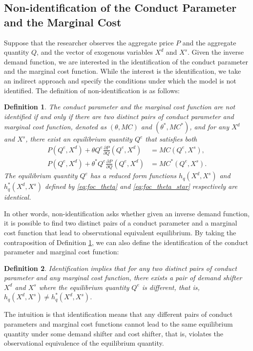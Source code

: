 \documentclass[11pt, a4paper]{article}
\newtheorem{definition}{Definition}
\theoremstyle{remark}
\begin{document}
\subsection{Non-identification of the Conduct Parameter and the Marginal Cost}\label{subsec:definition_identification}
Suppose that the researcher observes the aggregate price $P$ and the aggregate quantity $Q$, and the vector of exogenous variables $X^{d}$ and $X^{s}$.
Given the inverse demand function, we are interested in the identification of the conduct parameter and the marginal cost function.
While the interest is the identification, we take an indirect approach and specify the conditions under which the model is not identified.
The definition of non-identification is as follows:
\begin{definition}\label{definition:non_identification}
    The conduct parameter and the marginal cost function are not identified if and only if 
    there are two distinct pairs of conduct parameter and marginal cost function, denoted as $(\theta, MC)$ and $(\theta^{*}, MC^{*})$, and for any $X^{d}$ and $X^{s}$, there exist an equilibrium quantity $Q^e$ that satisfies both
    \begin{align}
    P(Q^e, X^{d}) + \theta Q^e\frac{\partial P}{\partial Q}(Q^e, X^{d}) & = MC(Q^e, X^{s}) ,  \label{eq:foc_theta}\\
    P(Q^e, X^{d}) + \theta^{*} Q^e\frac{\partial P}{\partial Q}(Q^e, X^{d}) & = MC^{*}(Q^e, X^{s}).\label{eq:foc_theta_star}
    \end{align}
    The equilibrium quantity $Q^e$ has a reduced form functions $h_q(X^{d}, X^{s})$ and $h_q^{*}(X^{d}, X^{s})$ defined by \eqref{eq:foc_theta} and \eqref{eq:foc_theta_star} respectively are identical.
\end{definition}
In other words, non-identification asks whether given an inverse demand function, it is possible to find two distinct pairs of a conduct parameter and a marginal cost function that lead to observational equivalent equilibrium.
By taking the contraposition of Definition \ref{definition:non_identification}, we can also define the identification of the conduct parameter and marginal cost function:
\begin{definition}\label{definition:identification}
    Identification implies that for any two distinct pairs of conduct parameter and any marginal cost function, there exists a pair of demand shifter $X^{d}$ and $X^{s}$ where the equilibrium quantity $Q^e$ is different, that is, $h_q(X^{d}, X^{s}) \ne h_q^{*}(X^{d}, X^{s})$.
\end{definition}
The intuition is that identification means that any different pairs of conduct parameters and marginal cost functions cannot lead to the same equilibrium quantity under some demand shifter and cost shifter, that is, violates the observational equivalence of the equilibrium quantity.
\end{document}

